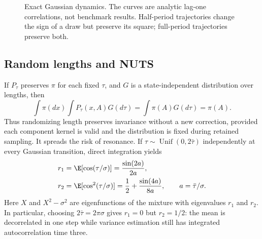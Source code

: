 \begin{figure}[htbp]
\centering
{}
\caption{Exact Gaussian dynamics. The curves are analytic lag-one
correlations, not benchmark results. Half-period trajectories change the sign
of a draw but preserve its square; full-period trajectories preserve both.}
\label{fig:bf-modern-resonance}
\end{figure}

\subsection{Random lengths and NUTS}

If $P_\tau$ preserves $\pi$ for each fixed $\tau$, and $G$ is a
state-independent distribution over lengths, then
\begin{equation}
 \int\pi(dx)\int P_\tau(x,A)G(d\tau)
   =\int\pi(A)G(d\tau)=\pi(A).
 \label{eq:bf-modern-mixture-invariance}
\end{equation}
Thus randomizing length preserves invariance without a new correction,
provided each component kernel is valid and the distribution is fixed during
retained sampling. It spreads the risk of resonance. If
$\tau\sim\operatorname{Unif}(0,2\bar\tau)$ independently at every
Gaussian transition, direct integration yields
\begin{align}
 r_1&=\E[\cos(\tau/\sigma)]
       =\frac{\sin(2a)}{2a},\\
 r_2&=\E[\cos^2(\tau/\sigma)]
       =\frac12+\frac{\sin(4a)}{8a},
 \qquad a=\bar\tau/\sigma.
 \label{eq:bf-modern-random-length-correlations}
\end{align}
Here $X$ and $X^2-\sigma^2$ are eigenfunctions of the mixture with
eigenvalues $r_1$ and $r_2$. In particular, choosing $2\bar\tau=2\pi\sigma$
gives $r_1=0$ but $r_2=1/2$: the mean is decorrelated in one step while
variance estimation still has integrated autocorrelation time three.

